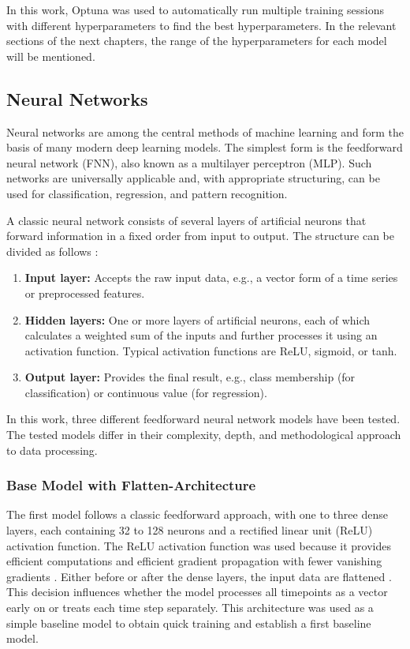 In this work, Optuna was used to automatically run multiple training sessions with different hyperparameters to find the best hyperparameters.
In the relevant sections of the next chapters, the range of the hyperparameters for each model will be mentioned.

\subsection{Neural Networks}
\label{chap:nn}

Neural networks are among the central methods of machine learning and form the basis of many modern deep learning models.
The simplest form is the feedforward neural network (FNN), also known as a multilayer perceptron (MLP).
Such networks are universally applicable and, with appropriate structuring, can be used for classification, regression, and pattern recognition.

A classic neural network consists of several layers of artificial neurons that forward information in a fixed order from input to output.
The structure can be divided as follows \cite{nn-basics}:

\begin{enumerate}
    \item \textbf{Input layer:} Accepts the raw input data, e.g., a vector form of a time series or preprocessed features.
    \item \textbf{Hidden layers:} One or more layers of artificial neurons, each of which calculates a weighted sum of the inputs and further processes it using an activation function.
    Typical activation functions are ReLU, sigmoid, or tanh.
    \item \textbf{Output layer:} Provides the final result, e.g., class membership (for classification) or continuous value (for regression).
\end{enumerate}

\noindent
In this work, three different feedforward neural network models have been tested.
The tested models differ in their complexity, depth, and methodological approach to data processing.

\subsubsection{Base Model with Flatten-Architecture}

The first model follows a classic feedforward approach, with one to three dense layers, each containing 32 to 128 neurons and a rectified linear unit (ReLU) activation function.
The ReLU activation function was used because it provides efficient computations and efficient gradient propagation with fewer vanishing gradients \cite{springer-ml-basics}.
Either before or after the dense layers, the input data are flattened \cite{keras-flatten}.
This decision influences whether the model processes all timepoints as a vector early on or treats each time step separately.
This architecture was used as a simple baseline model to obtain quick training and establish a first baseline model.

